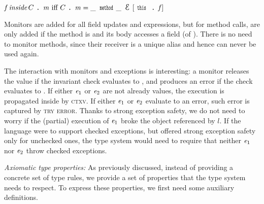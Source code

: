 $%
\f\, \textit{inside}\, C\singleDot\m\text{ iff }
C\singleDot\m=\_\,\Kw{method}\_\,\ctx[\Kw{this}\singleDot\f]
$


Monitors are added for all field updates and \Q@new@ expressions, but
for method calls, are only added if the method is \Q@mut@ and its body accesses a \Q@capsule@ field (of \Q@this@).
There is no need to monitor \Q@capsule@ methods, since their receiver is a unique alias and hence can never be used again.

The interaction with monitors and exceptions is interesting:
a monitor releases the value if the invariant check evaluates to \Q@true@, and produces an error if the 
check evaluates to \Q@false@.
If either ${\mathit{e}}_1$ or ${\mathit{e}}_2$ are not already values, the execution is propagated inside
by \textsc{ctxv}.
If either ${\mathit{e}}_1$ or ${\mathit{e}}_2$ evaluate to an error, such error is captured by 
\textsc{try error}.
Thanks to strong exception safety,
we do not need to worry
if the (partial) execution of ${\mathit{e}}_1$ broke the object referenced by $l$.
If the language were to support checked exceptions, but offered 
strong exception safety only for unchecked ones,
the type system would need to require that neither ${\mathit{e}}_1$ nor ${\mathit{e}}_2$ throw
checked exceptions.








\loseSpace
\textit{Axiomatic type properties:}
As previously discussed, instead of providing a concrete set of type rules, we provide a set of properties
that the type system needs to respect.
To express these properties, we first need some auxiliary definitions.


